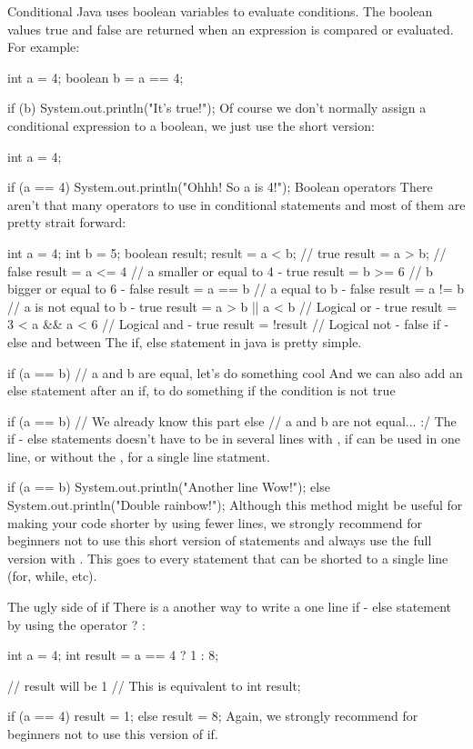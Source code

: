 Conditional
Java uses boolean variables to evaluate conditions. The boolean values true and false are returned when an expression is compared or evaluated. For example:

int a = 4;
boolean b = a == 4;

if (b) {
    System.out.println("It's true!");
}
Of course we don't normally assign a conditional expression to a boolean, we just use the short version:

int a = 4;

if (a == 4) {
    System.out.println("Ohhh! So a is 4!");
}
Boolean operators
There aren't that many operators to use in conditional statements and most of them are pretty strait forward:

int a = 4;
int b = 5;
boolean result;
result = a < b; // true
result = a > b; // false
result = a <= 4 // a smaller or equal to 4 - true
result = b >= 6 // b bigger or equal to 6 - false
result = a == b // a equal to b - false
result = a != b // a is not equal to b - true
result = a > b || a < b // Logical or - true
result = 3 < a && a < 6 // Logical and - true
result = !result // Logical not - false
if - else and between
The if, else statement in java is pretty simple.

if (a == b) {
    // a and b are equal, let's do something cool
}
And we can also add an else statement after an if, to do something if the condition is not true

if (a == b) {
    // We already know this part
} else {
    // a and b are not equal... :/
}
The if - else statements doesn't have to be in several lines with {}, if can be used in one line, or without the {}, for a single line statment.

if (a == b)
    System.out.println("Another line Wow!");
else
    System.out.println("Double rainbow!");
Although this method might be useful for making your code shorter by using fewer lines, we strongly recommend for beginners not to use this short version of statements and always use the full version with {}. This goes to every statement that can be shorted to a single line (for, while, etc).

The ugly side of if
There is a another way to write a one line if - else statement by using the operator ? :

int a = 4;
int result = a == 4 ? 1 : 8;

// result will be 1
// This is equivalent to
int result;

if (a == 4) {
    result = 1;
} else {
    result = 8;
}
Again, we strongly recommend for beginners not to use this version of if.

